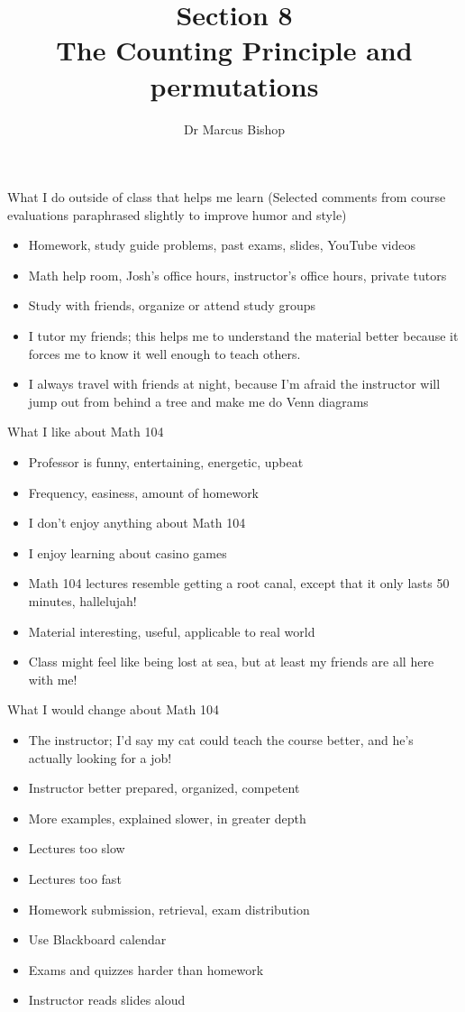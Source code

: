 \documentclass[handout]{beamer}
\title[\S8]{Section 8\\The Counting Principle and permutations}
\author{Dr Marcus Bishop}
\theoremstyle{definition}
\begin{document}
\begin{frame}\titlepage\end{frame}
\LogoOff

\begin{frame}
{What I do outside of class that helps me learn}
(Selected comments from course evaluations
paraphrased slightly to improve humor and style)
\begin{itemize}
\item Homework, study guide problems, past exams, slides,
YouTube videos
\item Math help room, Josh's office hours, instructor's office hours,
private tutors
\item Study with friends, organize or attend study groups
\item I tutor my friends;
this helps me to understand the material better because
it forces me to know it well enough to teach others.
\item I always travel with friends at night, because I'm afraid the
instructor will jump out from behind a tree and make me do Venn diagrams
\end{itemize}
\end{frame}

\begin{frame}{What I like about Math 104}
\begin{itemize}
\item Professor is funny, entertaining, energetic, upbeat
\item Frequency, easiness, amount of homework
\item I don't enjoy anything about Math 104
\item I enjoy learning about casino games
\item Math 104 lectures resemble
getting a root canal, except that it only lasts 50 minutes, hallelujah!
\item Material interesting, useful, applicable to real world
\item Class might feel like being lost at sea,
but at least my friends are all here with me!
\end{itemize}
\end{frame}

\begin{frame}{What I would change about Math 104}
\begin{itemize}
\item The instructor; I'd say my cat could teach the
course better, and he's actually looking for a job!
\item Instructor better prepared, organized, competent
\item More examples, explained slower, in greater depth
\item Lectures too slow
\item Lectures too fast
\item Homework submission, retrieval, exam distribution
\item Use Blackboard calendar
\item Exams and quizzes harder than homework
\item Instructor reads slides aloud
\end{itemize}
\end{frame}
\end{document}

